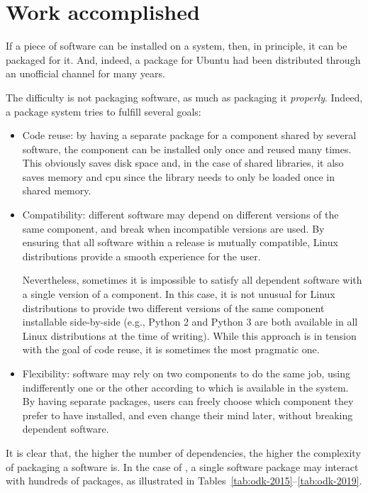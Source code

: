 \documentclass{deliverablereport}
\begin{document}
\section{Work accomplished}

If a piece of software can be installed on a system, then, in principle, it can
be packaged for it. %
And, indeed, a \Sage package for Ubuntu had been distributed through
an unofficial channel for many years.

The difficulty is not packaging software, as much as packaging it
\emph{properly}. %
Indeed, a package system tries to fulfill several goals:
\begin{itemize}
\item Code reuse: by having a separate package for a component shared
  by several software, the component can be installed only once and
  reused many times. This obviously saves disk space and, in the case
  of shared libraries, it also saves memory and cpu since the library
  needs to only be loaded once in shared memory.

\item Compatibility: different software may depend on different
  versions of the same component, and break when incompatible versions
  are used. By ensuring that all software within a release is mutually
  compatible, Linux distributions provide a smooth experience for the
  user.

  Nevertheless, sometimes it is impossible to satisfy all dependent
  software with a single version of a component. In this case, it is
  not unusual for Linux distributions to provide two different
  versions of the same component installable side-by-side (e.g.,
  Python 2 and Python 3 are both available in all Linux distributions
  at the time of writing). While this approach is in tension with the
  goal of code reuse, it is sometimes the most pragmatic one.
  
\item Flexibility: software may rely on two components to do the
  same job, using indifferently one or the other according to which is
  available in the system. By having separate packages, users can
  freely choose which component they prefer to have installed, and even
  change their mind later, without breaking dependent software.
\end{itemize}

It is clear that, the higher the number of dependencies, the higher
the complexity of packaging a software is. %
In the case of \ODK, a single software package may interact with hundreds of
packages, as illustrated in
Tables~\ref{tab:odk-2015}--\ref{tab:odk-2019}. %
\end{document}
